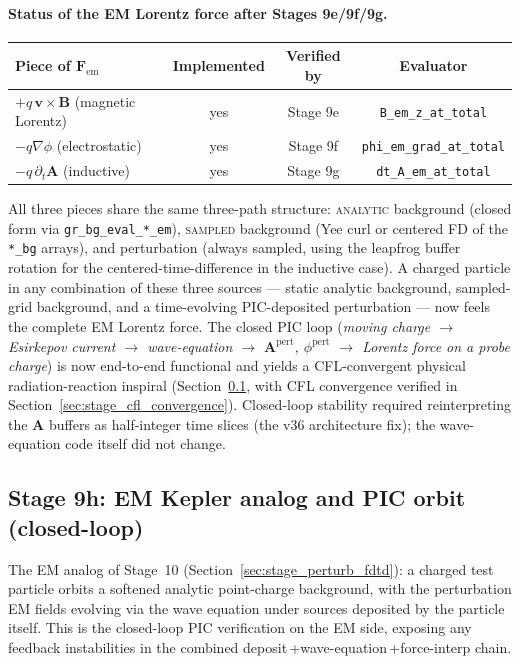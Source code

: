 \documentclass[11pt,a4paper]{article}
\newcommand{\vv}[1]{\mathbf{#1}}
\begin{document}
\paragraph{Status of the EM Lorentz force after Stages 9e/9f/9g.}
\begin{center}
\begin{tabular}{@{}lccc@{}}
\toprule
\textbf{Piece of $\vv{F}_{\mathrm{em}}$} & \textbf{Implemented} & \textbf{Verified by} & \textbf{Evaluator} \\
\midrule
$+ q\,\vv{v}\!\times\!\vv{B}$ (magnetic Lorentz) & yes & Stage 9e & \texttt{B\_em\_z\_at\_total} \\
$- q\nabla\phi$ (electrostatic)                  & yes & Stage 9f & \texttt{phi\_em\_grad\_at\_total} \\
$- q\,\partial_t\vv{A}$ (inductive)              & yes & Stage 9g & \texttt{dt\_A\_em\_at\_total} \\
\bottomrule
\end{tabular}
\end{center}
All three pieces share the same three-path structure: \textsc{analytic}
background (closed form via \texttt{gr\_bg\_eval\_*\_em}), \textsc{sampled}
background (Yee curl or centered FD of the \texttt{*\_bg} arrays), and
perturbation (always sampled, using the leapfrog buffer rotation for the
centered-time-difference in the inductive case).  A charged particle in
any combination of these three sources --- static analytic background,
sampled-grid background, and a time-evolving PIC-deposited perturbation
--- now feels the complete EM Lorentz force.  The closed PIC loop
(\emph{moving charge $\to$ Esirkepov current $\to$ wave-equation
$\to$ $\vv{A}^{\mathrm{pert}}$, $\phi^{\mathrm{pert}}$ $\to$ Lorentz force
on a probe charge}) is now end-to-end functional and yields a
CFL-convergent physical radiation-reaction inspiral
(Section~\ref{sec:stage_em_pic_orbit}, with CFL convergence verified in
Section~\ref{sec:stage_cfl_convergence}).  Closed-loop stability
required reinterpreting the $\vv{A}$ buffers as half-integer time
slices (the v36 architecture fix); the wave-equation code itself did
not change.

\subsection{Stage 9h: EM Kepler analog and PIC orbit (closed-loop)}
\label{sec:stage_em_pic_orbit}

The EM analog of Stage~10 (Section~\ref{sec:stage_perturb_fdtd}): a
charged test particle orbits a softened analytic point-charge background,
with the perturbation EM fields evolving via the wave equation under
sources deposited by the particle itself.  This is the closed-loop PIC
verification on the EM side, exposing any feedback instabilities in the
combined deposit$\,$+wave-equation$\,$+force-interp chain.
\end{document}
